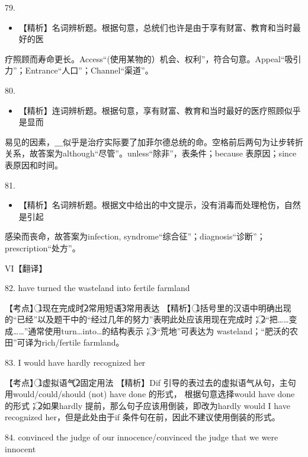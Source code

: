 \documentclass[UTF8,11pt]{ctexart}
\begin{document}
79.


\begin{itemize}[leftmargin=2em,itemsep=.2em,topsep=.4em]\item[B.] 【精析】名词辨析题。根据句意，总统们也许是由于享有财富、教育和当时最好的医
\end{itemize}

疗照顾而寿命更长。Access“(使用某物的）机会、权利”，符合句意。Appeal“吸引力”；Entrance“人口”；Channel“渠道”。


80.


\begin{itemize}[leftmargin=2em,itemsep=.2em,topsep=.4em]\item[C.] 【精析】连词辨析题。根据句意，享有财富、教育和当时最好的医疗照顾似乎是显而
\end{itemize}

易见的因素，＿似乎是治疗实际要了加菲尔德总统的命。空格前后两句为让步转折关系，故答案为although“尽管”。unless“除非”，表条件；because 表原因；since 表原因和时间。


81.


\begin{itemize}[leftmargin=2em,itemsep=.2em,topsep=.4em]\item[D.] 【精析】名词辨析题。根据文中给出的中文提示，没有消毒而处理枪伤，自然是引起
\end{itemize}

感染而丧命，故答案为infection, syndrome“综合征”；diagnosis“诊断”；prescription“处方”。


VI【翻译】


82. have turned the wasteland into fertile farmland


【考点】\textcircled{1}现在完成时\textcircled{2}常用短语\textcircled{3}常用表达 【精析】\textcircled{1}括号里的汉语中明确出现的“已经”以及题干中的“经过几年的努力”表明此处应该用现在完成时；\textcircled{2}“把……变成……”通常使用turn…into…的结构表示；\textcircled{3}“荒地”可表达为 wasteland；“肥沃的农田”可译为rich/fertile farmland。


83. I would have hardly recognized her


【考点】\textcircled{1}虚拟语气\textcircled{2}固定用法 【精析】Dif 引导的表过去的虚拟语气从句，主句用would/could/should (not) have done 的形式， 根据句意选择would have done 的形式；\textcircled{2}如果hardly 提前，那么句子应该用倒装，即改为hardly would I have recognized her，但是此处由于if 条件句在前，因此不建议使用倒装的形式。


84. convinced the judge of our innocence/convinced the judge that we were innocent
\end{document}
